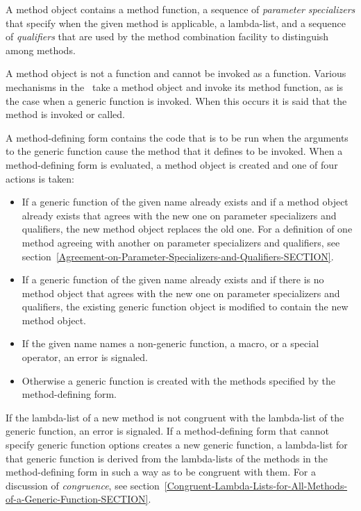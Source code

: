 A method object contains a method function, a sequence of \emph{
parameter specializers\/} that specify when the given method is
applicable, a lambda-list, and a sequence of \emph{qualifiers\/} that
are used by the method combination facility to distinguish among
methods.

A method object is not a function and cannot be invoked as a function. 
Various mechanisms in the \OS\ take a method object and invoke its method
function, as is the case when a generic function is invoked.  When this
occurs it is said that the method is invoked or called.

A method-defining form contains the code that is to be run when the
arguments to the generic function cause the method that it defines to
be invoked.  When a method-defining form is evaluated, a method object
is created and one of four actions is taken:

\begin{itemize}

\item  If a generic function of the given name already exists
and if a method object already exists that agrees with the new one on
parameter specializers and qualifiers, the new method object replaces
the old one.  For a definition of one method agreeing with another on
parameter specializers and qualifiers, see
section~\ref{Agreement-on-Parameter-Specializers-and-Qualifiers-SECTION}.

\item  If a generic function of the given name already exists
and if there is no method object that agrees with the new one on
parameter specializers and qualifiers, the existing generic function
object is modified to contain the new method object.

\item  If the given name names a non-generic function, a macro,
or a special operator, an error is signaled.

\item  Otherwise a generic function is created with the methods
specified by the method-defining form.

\end{itemize}

If the lambda-list of a new method is not congruent with the lambda-list
of the generic function, an error is signaled.  If a
method-defining form that cannot specify generic function options
creates a new generic function, a lambda-list for that generic
function is derived from the lambda-lists of the methods in the
method-defining form in such a way as to be congruent with them.  For
a discussion of \emph{congruence}, see
section~\ref{Congruent-Lambda-Lists-for-All-Methods-of-a-Generic-Function-SECTION}.


